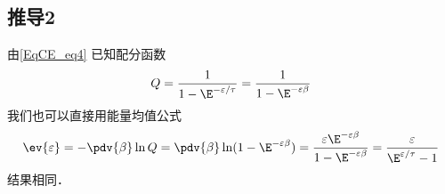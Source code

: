 \subsection{推导2}
由\autoref{EqCE_eq4} 已知配分函数
\begin{equation}
Q = \frac{1}{1 - \E^{-\varepsilon/\tau}} = \frac{1}{1 - \E^{-\varepsilon\beta}}
\end{equation}
我们也可以直接用能量均值公式
\begin{equation}
\ev{\varepsilon} = -\pdv{\beta} \ln Q
= \pdv{\beta} \ln (1 - \E^{-\varepsilon\beta}) = \frac{\varepsilon \E^{-\varepsilon\beta}}{1 - \E^{-\varepsilon\beta}} = \frac{\varepsilon}{\E^{\varepsilon /\tau} - 1}
\end{equation}
结果相同．
